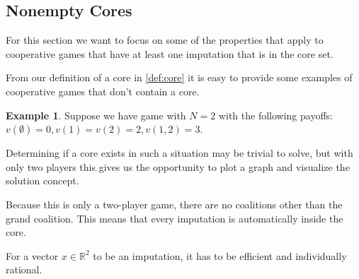 \documentclass[10pt,a4paper,titlepage]{article}
\theoremstyle{plain}
\theoremstyle{definition}
\newtheorem{exmp}[thm]{Example} %
\begin{document}
 \subsection{Nonempty Cores}
 For this section we want to focus on some of the properties that apply to cooperative games that have at least one imputation that is in the core set.

 From our definition of a core in \ref{def:core} it is easy to provide some examples of cooperative games that don't contain a core.

 \begin{exmp}
    Suppose we have game with $N = 2$ with the following payoffs: $v(\emptyset) = 0, v(1) = v(2) = 2, v(1, 2) = 3$.

    Determining if a core exists in such a situation may be trivial to solve, but with only two players this gives us the opportunity to plot a graph and visualize the solution concept.
    
    Because this is only a two-player game, there are no coalitions other than the grand coalition. This means that every imputation is automatically inside the core.

    For a vector $x \in \mathbb{R}^2$ to be an imputation, it has to be efficient and individually rational.

 \end{exmp}

 
\end{document}
